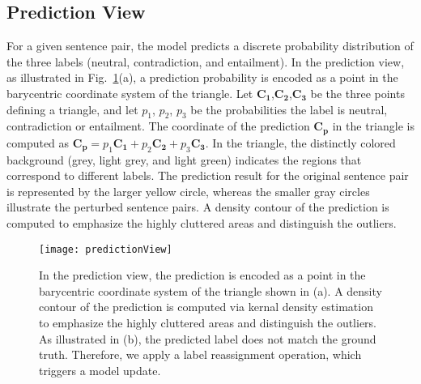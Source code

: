 
\subsection{Prediction View}
\label{sec:prediction}
For a given sentence pair, the model predicts a discrete probability distribution of the three labels (neutral, contradiction, and entailment).
%
In the prediction view, as illustrated in Fig.~\ref{fig:predictionView}(a), a prediction probability is encoded as a point in the barycentric coordinate system of the triangle.
Let $\mathbf{C_1}$,$\mathbf{C_2}$,$\mathbf{C_3}$ be the three points defining a triangle, and let $p_1$, $p_2$, $p_3$ be the probabilities the label is neutral, contradiction or entailment. The coordinate of the prediction $\mathbf{C_p}$ in the triangle is computed as $\mathbf{C_p} = p_1\mathbf{C_1}+p_2\mathbf{C_2}+p_3\mathbf{C_3}$.
In the triangle, the distinctly colored background (grey, light grey, and light green) indicates the regions that correspond to different labels. The prediction result for the original sentence pair is represented by the larger yellow circle, whereas the smaller gray circles illustrate the perturbed sentence pairs. A density contour of the prediction is computed to emphasize the highly cluttered areas and distinguish the outliers.

\begin{figure}[htbp]
\centering
\vspace{-2mm}
 \texttt{[image: predictionView]}
 \vspace{-5mm}
 \caption{
In the prediction view, the prediction is encoded as a point in the barycentric coordinate system of the triangle shown in (a).
A density contour of the prediction is computed via kernal density estimation to emphasize the highly cluttered areas and distinguish the outliers.
As illustrated in (b), the predicted label does not match the ground truth. Therefore, we apply a label reassignment operation, which triggers a model update.
 }
  \vspace{-2mm}
\label{fig:predictionView}
\end{figure}

